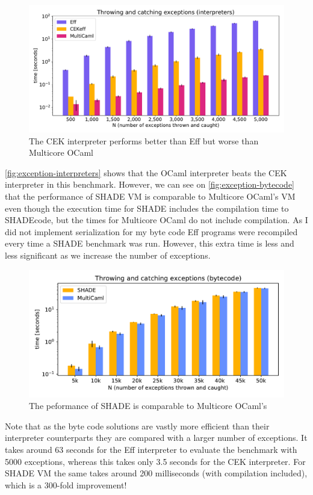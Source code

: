 \documentclass[class=article, crop=false]{standalone}
\begin{document}
\begin{figure}[htb]
    \centering
    \includegraphics[width=.9\linewidth]{eval_plots/interp_exception.pdf}
    \caption[Exception benchmark (interpreters)]{The CEK interpreter performs better than Eff but worse than Multicore OCaml}
    \label{fig:exception-interpreters}
\end{figure}

\autoref{fig:exception-interpreters} shows that the OCaml interpreter beats
the CEK interpreter in this benchmark. However, we can see on
\autoref{fig:exception-bytecode} that the performance of SHADE VM is
comparable to Multicore OCaml's VM even though the
execution time for SHADE includes the compilation time to SHADEcode,
but the times for Multicore OCaml do not include compilation. As I did not
implement serialization for my byte code Eff programs were recompiled every time
a SHADE benchmark was run. However, this extra time is less and less significant
as we increase the number of exceptions.

\begin{figure}[htb]
    \centering
    \includegraphics[width=.8\linewidth]{eval_plots/comp_exception.pdf}
    \caption[Exception benchmark (compilers)]{The peformance of SHADE is comparable to Multicore OCaml's}
    \label{fig:exception-bytecode}
\end{figure}

Note that as the byte code solutions are vastly more efficient than their
interpreter counterparts they are compared with a larger number of exceptions.
It takes around 63 seconds for the Eff interpreter to evaluate the benchmark
with 5000 exceptions, whereas this takes only 3.5 seconds for the CEK
interpreter. For SHADE VM the same takes around 200 milliseconds
(with compilation included), which is a 300-fold improvement!
\end{document}
